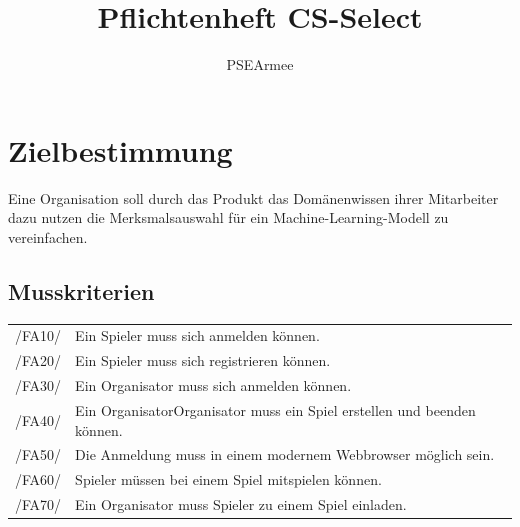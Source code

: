 \documentclass[a4paper]{scrreprt}
\begin{document}
 
\title{Pflichtenheft CS-Select}
\author{PSEArmee}
\maketitle
 
\tableofcontents
 
\chapter{Zielbestimmung}
Eine Organisation soll durch das \Gls{Produkt} das Domänenwissen ihrer Mitarbeiter dazu nutzen die Merksmalsauswahl für ein Machine-Learning-Modell zu vereinfachen.

\section{Musskriterien}
\begin{tabular}{ l | l}
/FA10/ & Ein \Gls{Spieler} muss sich anmelden können. \\ 
/FA20/ & Ein \Gls{Spieler} muss sich registrieren können. \\
/FA30/ & Ein \Gls{Organisator} muss sich anmelden können. \\
/FA40/ & Ein \Gls{Organisator}\Gls{Organisator} muss ein \Gls{Spiel} erstellen und beenden können. \\
/FA50/ & Die Anmeldung muss in einem modernem \Gls{Webbrowser} möglich sein. \\
/FA60/ & \Gls{Spieler} müssen bei einem \Gls{Spiel} mitspielen können. \\
/FA70/ & Ein \Gls{Organisator} muss \Gls{Spieler} zu einem \Gls{Spiel} einladen. \\
\end{tabular}
\end{document}
